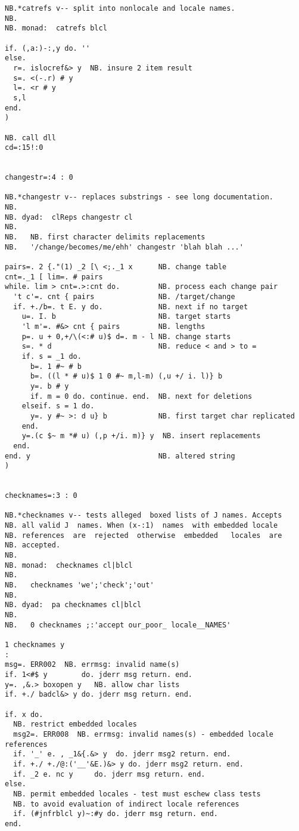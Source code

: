\begin{lstlisting}[frame=single,framerule=0pt,basicstyle=\ttfamily\tiny]
NB.*catrefs v-- split into nonlocale and locale names.
NB.
NB. monad:  catrefs blcl

if. (,a:)-:,y do. ''
else.
  r=. islocref&> y  NB. insure 2 item result
  s=. <(-.r) # y
  l=. <r # y
  s,l
end.
)

NB. call dll
cd=:15!:0


changestr=:4 : 0

NB.*changestr v-- replaces substrings - see long documentation.
NB.
NB. dyad:  clReps changestr cl
NB.
NB.   NB. first character delimits replacements
NB.   '/change/becomes/me/ehh' changestr 'blah blah ...'

pairs=. 2 {."(1) _2 [\ <;._1 x      NB. change table
cnt=._1 [ lim=. # pairs
while. lim > cnt=.>:cnt do.         NB. process each change pair
  't c'=. cnt { pairs               NB. /target/change
  if. +./b=. t E. y do.             NB. next if no target
    u=. I. b                        NB. target starts
    'l m'=. #&> cnt { pairs         NB. lengths
    p=. u + 0,+/\(<:# u)$ d=. m - l NB. change starts
    s=. * d                         NB. reduce < and > to =
    if. s = _1 do.
      b=. 1 #~ # b
      b=. ((l * # u)$ 1 0 #~ m,l-m) (,u +/ i. l)} b
      y=. b # y
      if. m = 0 do. continue. end.  NB. next for deletions
    elseif. s = 1 do.
      y=. y #~ >: d u} b            NB. first target char replicated
    end.
    y=.(c $~ m *# u) (,p +/i. m)} y  NB. insert replacements
  end.
end. y                              NB. altered string
)


checknames=:3 : 0

NB.*checknames v-- tests alleged  boxed lists of J names. Accepts
NB. all valid J  names. When (x-:1)  names  with embedded locale
NB. references  are  rejected  otherwise  embedded   locales  are
NB. accepted.
NB.
NB. monad:  checknames cl|blcl
NB.
NB.   checknames 'we';'check';'out'
NB.
NB. dyad:  pa checknames cl|blcl
NB.
NB.   0 checknames ;:'accept our_poor_ locale__NAMES'

1 checknames y
:
msg=. ERR002  NB. errmsg: invalid name(s)
if. 1<#$ y        do. jderr msg return. end.
y=. ,&.> boxopen y   NB. allow char lists
if. +./ badcl&> y do. jderr msg return. end.

if. x do.
  NB. restrict embedded locales
  msg2=. ERR008  NB. errmsg: invalid names(s) - embedded locale references
  if. '_' e. , _1&{.&> y  do. jderr msg2 return. end.
  if. +./ +./@:('__'&E.)&> y do. jderr msg2 return. end.
  if. _2 e. nc y     do. jderr msg return. end.
else.
  NB. permit embedded locales - test must eschew class tests
  NB. to avoid evaluation of indirect locale references
  if. (#jnfrblcl y)~:#y do. jderr msg return. end.
end.


\end{lstlisting}
